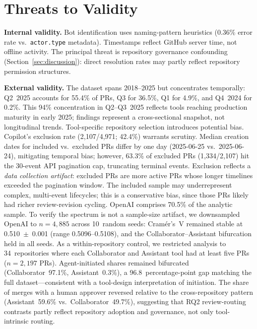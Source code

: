 \documentclass[sigconf]{acmart}
\begin{document}
\section{Threats to Validity}
\label{sec:threats}

\textbf{Internal validity.}
Bot identification uses naming-pattern heuristics (0.36\% error
rate vs.\ \texttt{actor.type} metadata).
Timestamps reflect GitHub server time, not offline activity.
The principal threat is repository governance confounding (Section~\ref{sec:discussion}): direct resolution rates may partly reflect repository permission structures.

\textbf{External validity.}
The dataset spans 2018--2025 but concentrates temporally:
Q2~2025 accounts for 55.4\% of PRs, Q3 for 36.5\%, Q1 for
4.9\%, and Q4~2024 for 0.2\%.
This 94\% concentration in Q2--Q3~2025 reflects tools reaching
production maturity in early 2025; findings represent a
cross-sectional snapshot, not longitudinal trends.
Tool-specific repository selection introduces potential bias.
Copilot's exclusion rate (2,107/4,971; 42.4\%) warrants
scrutiny.
Median creation dates for included vs.\ excluded PRs differ by one day
(2025-06-25 vs.\ 2025-06-24), mitigating temporal bias; however,
63.3\% of excluded PRs (1,334/2,107) hit the 30-event API pagination cap,
truncating terminal events.
Exclusion reflects a \emph{data collection artifact}: excluded
PRs are more active PRs whose longer timelines exceeded the
pagination window.
The included sample may underrepresent complex, multi-event
lifecycles; this is a conservative bias, since those PRs likely had
richer review-revision cycling.
OpenAI comprises 70.5\% of the analytic sample.
To verify the spectrum is not a sample-size artifact, we
downsampled OpenAI to $n = 4{,}885$ across 10~random seeds: Cram\'er's~V remained
stable at 0.510~$\pm$~0.001 (range 0.5096--0.5108), and the
Collaborator--Assistant bifurcation held in all seeds.
As a within-repository control, we restricted analysis to 34~repositories where each Collaborator and Assistant tool had at least five PRs ($n = 2{,}197$ PRs).
Agent-initiated shares remained bifurcated (Collaborator~97.1\%, Assistant~0.3\%), a 96.8~percentage-point gap matching the full dataset---consistent with a tool-design interpretation of initiation.
The share of merges with a human approver reversed relative to the cross-repository pattern (Assistant~59.6\% vs.\ Collaborator~49.7\%), suggesting that RQ2 review-routing contrasts partly reflect repository adoption and governance, not only tool-intrinsic routing.
\end{document}
